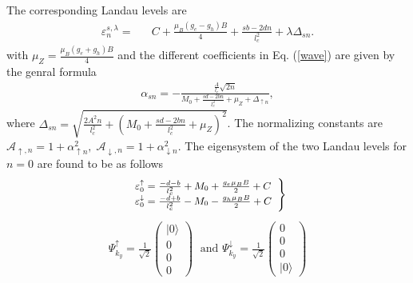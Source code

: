 \documentclass[prb,twocolumn]{revtex4-1}
\begin{document}
The corresponding Landau levels are
\begin{eqnarray}
\varepsilon_{n}^{s,\lambda}=&&C+\frac{\mu_B(g_e-g_h)B}{4}+\frac{sb-2dn}{l_c^2}+\lambda\Delta_{s n}.%
\end{eqnarray}
with $\mu_Z=\frac{\mu_B(g_e+g_h)B}{4}$ and the different coefficients in Eq. (\ref{wave}) are given by the genral formula
\begin{eqnarray}
\alpha_{s n}=-\frac{\frac{A}{l_c}\sqrt{2n}}{M_0+\frac{sd-2bn}{l_c^2}+\mu_Z+\Delta_{\uparrow n}},
\end{eqnarray}
where $\Delta_{s n}=\sqrt{\frac{2A^2n}{l_c^2}+(M_0+\frac{sd-2bn}{l_c^2}+\mu_Z)^2}$. %
The normalizing constants are
$
\mathcal{A}_{\uparrow,n }=1+\alpha_{\uparrow n}^2,
\; \mathcal{A}_{\downarrow, n}=1+\alpha_{\downarrow n}^2
$.
The eigensystem of the two Landau levels for $n=0$ are found to be as follows
\begin{eqnarray}
{\small
	\left.
	\begin{array}{ll}	
\varepsilon_0^\uparrow=\frac{-d-b}{l_c^2}+M_0+\frac{g_e \mu_B B}{2}+C\\
\varepsilon_0^\downarrow=\frac{-d+b}{l_c^2}-M_0-\frac{g_h \mu_B B}{2}+C
	\end{array}
\right\}}
\end{eqnarray}
\begin{eqnarray}
\Psi_{k_y}^{\uparrow}=\frac{1}{\sqrt{2}}\begin{pmatrix}
\vert 0\rangle\\
0\\
0\\
0
\end{pmatrix}\;\text{ and }
\Psi_{k_y}^{\downarrow}=\frac{1}{\sqrt{2}}\begin{pmatrix}
	0\\
	0\\
	0\\
	\vert 0\rangle
\end{pmatrix}
\end{eqnarray}
\end{document}
